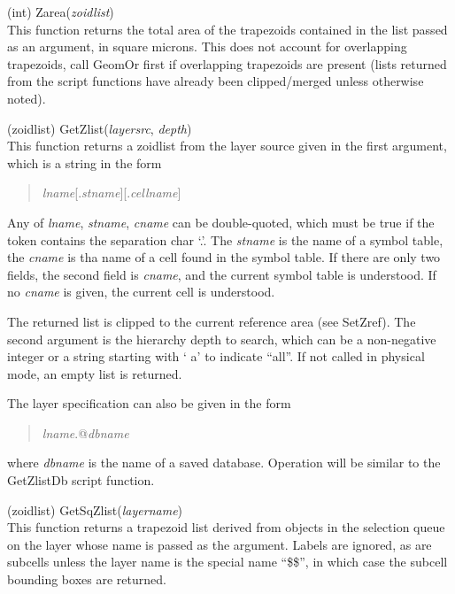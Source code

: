 \begin{description}
\item{(int) \vt Zarea({\it zoidlist\/})}\\
This function returns the total area of the trapezoids contained in
the list passed as an argument, in square microns.  This does not
account for overlapping trapezoids, call {\vt GeomOr} first if
overlapping trapezoids are present (lists returned from the script
functions have already been clipped/merged unless otherwise noted).

\item{(zoidlist) \vt GetZlist({\it layersrc}, {\it depth\/})}\\
This function returns a zoidlist from the layer source given in
the first argument, which is a string in the form
\begin{quote}
{\it lname}[{\vt .}{\it stname\/}][{\vt .}{\it cellname\/}]
\end{quote}
Any of {\it lname}, {\it stname}, {\it cname} can be 
double-quoted, which must be true if the token contains the 
separation char `{\vt .}'.  The {\it stname} is the name of a
symbol table, the {\it cname} is tha name of a cell found in the   
symbol table.  If there are only two fields, the second field is
{\it cname}, and the current symbol table is understood.  If no     
{\it cname} is given, the current cell is understood.

The returned list is clipped to the current reference area (see {\vt
SetZref}).  The second argument is the hierarchy depth to search,
which can be a non-negative integer or a string starting with `{\vt
a}' to indicate ``{\vt all}''.  If not called in physical mode, an
empty list is returned.

The layer specification can also be given in the form
\begin{quote}
{\it lname\/}{\vt .@}{\it dbname}
\end{quote}
where {\it dbname} is the name of a saved database.  Operation will be
similar to the {\vt GetZlistDb} script function.

\item{(zoidlist) \vt GetSqZlist({\it layername})}\\
This function returns a trapezoid list derived from objects in the
selection queue on the layer whose name is passed as the argument. 
Labels are ignored, as are subcells unless the layer name is the
special name ``\$\$'', in which case the subcell bounding boxes are
returned.


\end{description}
